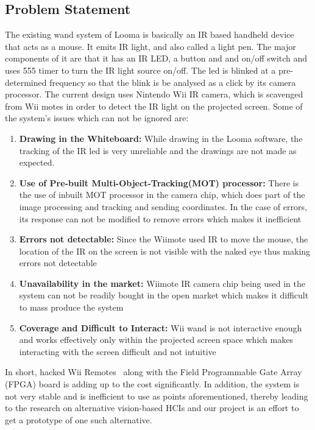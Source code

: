\documentclass[12pt, a4paper]{article}
\begin{document}
\subsection{Problem Statement}
The existing wand system of Looma is basically an IR based handheld device that acts as a mouse. It emits IR light, and also called a light pen. The major components of it are that it has an IR LED, a button and and on/off switch and uses 555 timer to turn the IR light source on/off. The led is blinked at a pre-determined frequency so that the blink is be analysed as a click by its camera processor. The current design uses Nintendo Wii IR camera, which is scavenged from Wii motes in order to detect the IR light on the projected screen. Some of the system's issues which can not be ignored are:

\begin{enumerate}
\item \textbf {Drawing in the Whiteboard:} While drawing in the Looma software, the tracking of the IR led is very unreliable and the drawings are not made as expected.
\item \textbf{Use of Pre-built Multi-Object-Tracking(MOT) processor:} There is the use of inbuilt MOT processor in the camera chip, which does part of the image processing and tracking and sending coordinates. In the case of errors, its response can not be modified to remove errors which makes it inefficient
\item \textbf{Errors not detectable:} Since the Wiimote used IR to move the mouse, the location of the IR on the screen is not visible with the naked eye thus making errors not detectable 
\item \textbf{Unavailability in the market:} Wiimote IR camera chip being used in the system can not be readily bought in the open market which makes it difficult to mass produce the system
\item \textbf{Coverage and Difficult to Interact:} Wii wand is not interactive enough and works effectively only within the projected screen space which makes interacting with the screen difficult and not intuitive
\end{enumerate}

In short, hacked Wii Remotes~\cite{joh} along with the Field Programmable Gate Array (FPGA) board is adding up to the cost significantly. In addition, the system is not very stable and is inefficient to use as points aforementioned, thereby leading to the research on alternative vision-based HCIs and our project is an effort to get
a prototype of one such alternative.
\end{document}
